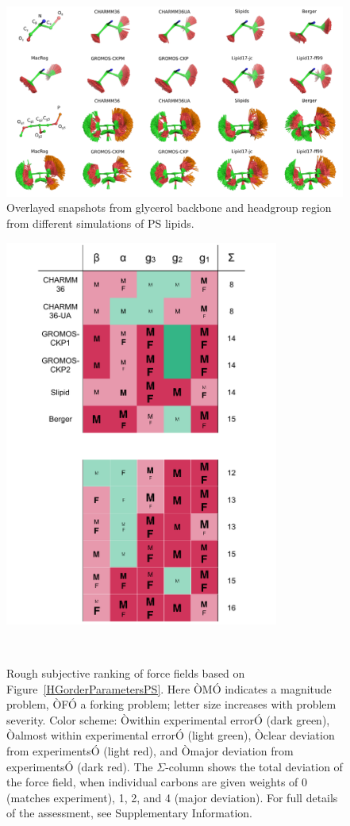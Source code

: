 \documentclass[aps,prl,superscriptaddress,twocolumn]{revtex4}
\begin{document}
\begin{figure}[]
  \centering
  \includegraphics[width=18.0cm]{../Figs/figS8.png}
  \caption{\label{HGstructuresPS}
    Overlayed snapshots from glycerol backbone and headgroup region from 
    different simulations of PS lipids.
  }
\end{figure}

\begin{figure}[]
  \centering
  \includegraphics[width=9.0cm]{../Figs/comparisonTablePS.pdf}
  \caption{\label{comparisonTablePS}
  Rough subjective ranking of force fields based on Figure~\ref{HGorderParametersPS}. Here ÒMÓ indicates a magnitude problem, ÒFÓ a forking problem; letter size increases with problem severity. Color scheme: Òwithin experimental errorÓ (dark green), Òalmost within experimental errorÓ (light green), Òclear deviation from experimentsÓ (light red), and Òmajor deviation from experimentsÓ (dark red). The $\Sigma$-column shows the total deviation of the force field, when individual carbons are given weights of 0 (matches experiment), 1, 2, and 4 (major deviation). For full details of the assessment, see Supplementary Information.
  }
   \\
\end{figure}
\end{document}
